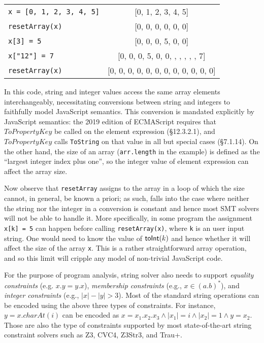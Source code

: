 \documentclass[sigplan,review,anonymous]{acmart}\settopmatter{printfolios=true,printccs=false,printacmref=false}
\begin{document}
\begin{tabular}{l|c}
	{\tt{x = [0, 1, 2, 3, 4, 5]}} & [0, 1, 2, 3, 4, 5] \\
	{\tt{resetArray(x)}} & [0, 0, 0, 0, 0, 0] \\
	{\tt{x[3] = 5}} & [0, 0, 0, 5, 0, 0] \\
	{\tt{x["12"] = 7}} & [0, 0, 0, 5, 0, 0, , , , , , 7] \\
	{\tt{resetArray(x)}} & [0, 0, 0, 0, 0, 0, 0, 0, 0, 0, 0, 0] \\
\end{tabular}

In this code, string and integer values access the same array elements interchangeably, necessitating conversions between string and integers to faithfully model JavaScript semantics.  This conversion is mandated explicitly by JavaScript semantics: the 2019 edition of ECMAScript requires that $ToPropertyKey$ be called on the element expression (\S{12.3.2.1}), and $ToPropertyKey$ calls {\tt{ToString}} on that value in all but special cases (\S{7.1.14}). On the other hand, the size of an array ({\tt{arr.length}} in the example) is defined as the ``largest integer index plus one'', so the integer value of element expression can affect the array size.

Now observe that {\tt{resetArray}} assigns to the array in a loop of which the size cannot, in general, be known a priori; as such, falls into the case where neither the string nor the integer in a conversion is constant and hence most SMT solvers will not be able to handle it. More specifically, in some program the assignment {\tt{x[k] = 5}} can happen before calling {\tt{resetArray(x)}}, where {\tt{k}} is an user input string. One would need to know the value of $\mbox{\textsf{toInt}($k$)}$ and hence whether it will affect the size of the array {\tt{x}}. This is a rather straightforward array operation, and so this limit will cripple any model of non-trivial JavaScript code. 

For the purpose of program analysis, string solver also needs to support \emph{equality constraints} (e.g. $x.y = y.x$), \emph{membership constraints} (e.g., $x \in (a.b)^*$), and \emph{integer constraints} (e.g., $|x|-|y|>3$). Most of the standard string operations can be encoded using the above three types of constraints. For instance, $y=x.charAt(i)$ can be encoded as $x=x_1.x_2.x_3 \wedge |x_1| = i \wedge |x_2| =1 \wedge y= x_2$. Those are also the type of constraints supported by most state-of-the-art string constraint solvers such as Z3, CVC4, Z3Str3, and Trau+.
\end{document}
